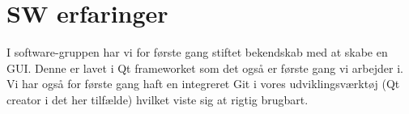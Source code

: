 \section{SW erfaringer}

I software-gruppen har vi for første gang stiftet bekendskab med at skabe en GUI. Denne er lavet i Qt frameworket som det også er første gang vi arbejder i. Vi har også for første gang haft en integreret Git i vores udviklingsværktøj (Qt creator i det her tilfælde) hvilket viste sig at rigtig brugbart.